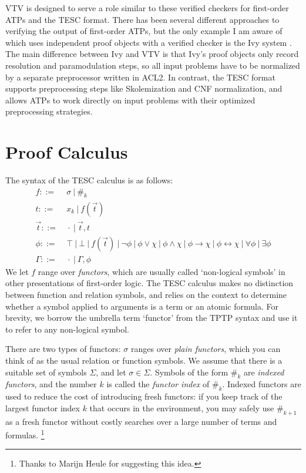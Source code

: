 \documentclass{lipics-v2021}
\newcommand{\idf}[1]{\#_{#1}}
\begin{document}
VTV is designed to serve a role similar to these verified checkers for 
first-order ATPs and the TESC format. There has been several different 
approaches \cite{sutcliffe2006semantic, chihani2015proof} to verifying 
the output of first-order ATPs, but the only example I am aware of
which uses independent proof objects with a verified checker is the 
Ivy system \cite{mccune2000ivy}. The main difference between Ivy and 
VTV is that Ivy's proof objects only record resolution and paramodulation 
steps, so all input problems have to be normalized by a separate 
preprocessor written in ACL2. In contrast, the TESC format supports 
preprocessing steps like Skolemization and CNF normalization, and 
allows ATPs to work directly on input problems with their optimized 
preprocessing strategies.



\section{Proof Calculus} \label{sec:proof-calc} 

The syntax of the TESC calculus is as follows:
\begin{align*}
f ::= &\ \sigma\ |\ \idf{k}\\
t ::= &\ x_k\ |\ f(\vec{t})\\
\vec{t} ::= &\ \cdot\ |\ \vec{t}, t\\
\phi ::= &\ \top\ |\ \bot\ |\ f(\vec{t})\ |\ \lnot \phi\ |\ \phi \lor \chi\ |\ \phi \land \chi\ |\ \phi \to \chi\ |\ \phi \leftrightarrow \chi\ |\ \forall \phi\ |\ \exists \phi\\
\Gamma ::= &\ \cdot\ |\ \Gamma, \phi
\end{align*}
We let $f$ range over \textit{functors}, which are usually called `non-logical symbols' in
other presentations of first-order logic. The TESC calculus makes no distinction
between function and relation symbols, and relies on the context to determine whether 
a symbol applied to arguments is a term or an atomic formula. For brevity, we borrow
the umbrella term `functor' from the TPTP syntax and use it to refer to any non-logical symbol.

There are two types of functors: $\sigma$ ranges over \textit{plain functors}, 
which you can think of as the usual relation or function symbols. We assume that there 
is a suitable set of symbols $\Sigma$, and let $\sigma \in \Sigma$.
Symbols of the form $\idf{k}$ are \textit{indexed functors}, and the number $k$ is 
called the \textit{functor index} of $\idf{k}$. Indexed functors are used to reduce 
the cost of introducing fresh functors: if you keep track of the largest functor index
$k$ that occurs in the environment, you may safely use $\idf{k+1}$ as a fresh functor
without costly searches over a large number of terms and formulas. \footnote{Thanks to Marijn Heule for suggesting this idea.}
\end{document}
